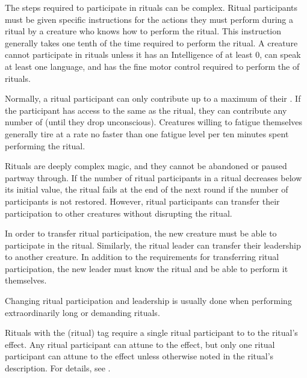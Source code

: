             The steps required to participate in rituals can be complex.
            Ritual participants must be given specific instructions for the actions they must perform during a ritual by a creature who knows how to perform the ritual.
            This instruction generally takes one tenth of the time required to perform the ritual.
            A creature cannot participate in rituals unless it has an Intelligence of at least 0, can speak at least one language, and has the fine motor control required to perform the  of rituals.

            Normally, a ritual participant can only contribute  up to a maximum of their .
            If the participant has access to the same  as the ritual, they can contribute any number of  (until they drop unconscious).
            Creatures willing to fatigue themselves generally tire at a rate no faster than one fatigue level per ten minutes spent performing the ritual.

            Rituals are deeply complex magic, and they cannot be abandoned or paused partway through.
            If the number of ritual participants in a ritual decreases below its initial value, the ritual fails at the end of the next round if the number of participants is not restored.
            However, ritual participants can transfer their participation to other creatures without disrupting the ritual.

            In order to transfer ritual participation, the new creature must be able to participate in the ritual.
            Similarly, the ritual leader can transfer their leadership to another creature.
            In addition to the requirements for transferring ritual participation, the new leader must know the ritual and be able to perform it themselves.

            Changing ritual participation and leadership is usually done when performing extraordinarily long or demanding rituals.

                Rituals with the  (ritual) tag require a single ritual participant to  to the ritual's effect.
                Any ritual participant can attune to the effect, but only one ritual participant can attune to the effect unless otherwise noted in the ritual's description.
                For details, see .

